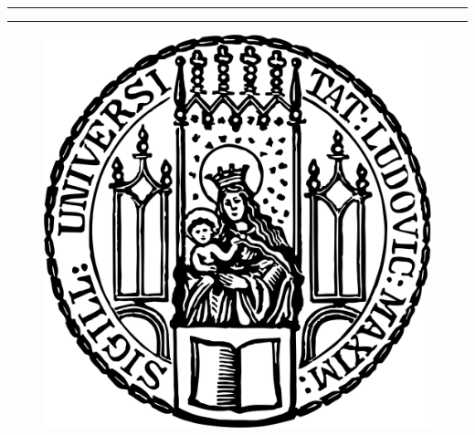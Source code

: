 \begin{titlepage}   

    {\parindent0cm
    \rule{\linewidth}{.4ex}}  
  \begin{center}
    {\sffamily \bfseries \Huge \getTitleEN \par}
  \end{center}
    \rule{\linewidth}{.4ex}
  

  \begin{center}



  \begin{figure}[!h]
    \centering
    \includegraphics[scale=0.15]{figures/lmu-siegel.png}
  \end{figure}
  

     {\scshape \large

}
\end{center}
\end{titlepage}
